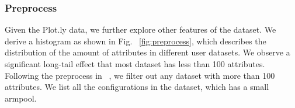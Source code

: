 \subsubsection{Preprocess}
Given the Plot.ly data, we further explore other features of the dataset. We derive a histogram as shown in Fig. ~\ref{fig:preprocess}, which describes the distribution of the amount of attributes in different user datasets. We observe a significant long-tail effect that most dataset has less than 100 attributes. Following the preprocess in ~\cite{qian_personalized_2021}, we filter out any dataset with more than 100 attributes. We list all the configurations in the dataset, which has a small armpool.


        

